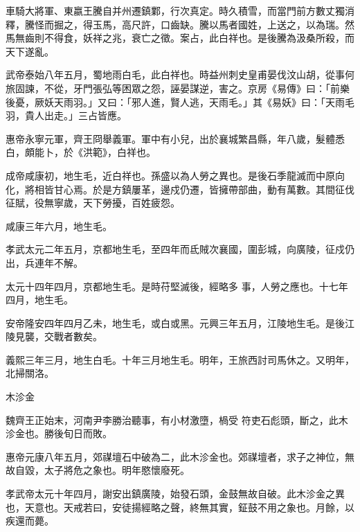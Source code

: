 \begin{pinyinscope}
 車騎大將軍、東嬴王騰自并州遷鎮鄴，行次真定。時久積雪，而當門前方數丈獨消釋，騰怪而掘之，得玉馬，高尺許，口齒缺。騰以馬者國姓，上送之，以為瑞。然馬無齒則不得食，妖祥之兆，衰亡之徵。案占，此白祥也。是後騰為汲桑所殺，而天下遂亂。



 武帝泰始八年五月，蜀地雨白毛，此白祥也。時益州刺史皇甫晏伐汶山胡，從事何旅固諫，不從，牙門張弘等困眾之怨，誣晏謀逆，害之。京房《易傳》曰：「前樂後憂，厥妖天雨羽。」又曰：「邪人進，賢人逃，天雨毛。」其《易妖》曰：「天雨毛羽，貴人出走。」三占皆應。



 惠帝永寧元軍，齊王冏舉義軍。軍中有小兒，出於襄城繁昌縣，年八歲，髮體悉白，頗能卜，於《洪範》，白祥也。



 成帝咸康初，地生毛，近白祥也。孫盛以為人勞之異也。是後石季龍滅而中原向化，將相皆甘心焉。於是方鎮屢革，邊戍仍遷，皆擁帶部曲，動有萬數。其間征伐征賦，役無寧歲，天下勞擾，百姓疲怨。



 咸康三年六月，地生毛。



 孝武太元二年五月，京都地生毛，至四年而氐賊次襄國，圍彭城，向廣陵，征戍仍出，兵連年不解。



 太元十四年四月，京都地生毛。是時苻堅滅後，經略多
 事，人勞之應也。十七年四月，地生毛。



 安帝隆安四年四月乙未，地生毛，或白或黑。元興三年五月，江陵地生毛。是後江陵見襲，交戰者數矣。



 義熙三年三月，地生白毛。十年三月地生毛。明年，王旅西討司馬休之。又明年，北掃關洛。



 木沴金



 魏齊王正始末，河南尹李勝治聽事，有小材激墮，楇受
 符吏石彪頭，斷之，此木沴金也。勝後旬日而敗。



 惠帝元康八年五月，郊禖壇石中破為二，此木沴金也。郊禖壇者，求子之神位，無故自毀，太子將危之象也。明年愍懷廢死。



 孝武帝太元十年四月，謝安出鎮廣陵，始發石頭，金鼓無故自破。此木沴金之異也，天意也。天戒若曰，安徒揚經略之聲，終無其實，鉦鼓不用之象也。月餘，以疾還而薨。




\end{pinyinscope}
